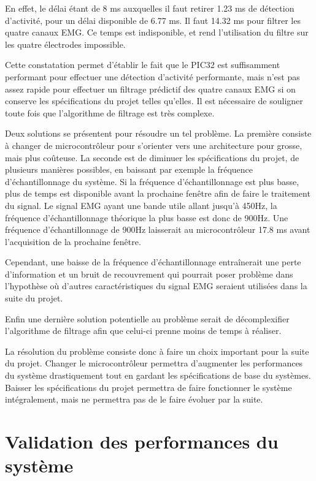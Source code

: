 \documentclass[letterpaper, twoside, 12pt, memoire, creativecommons, hyperref]{thETS}
\begin{document}
En effet, le délai étant de 8 ms auxquelles il faut retirer 1.23 ms de détection d'activité, pour un délai disponible de 6.77 ms. Il faut 14.32 ms pour filtrer les quatre canaux EMG. Ce temps est indisponible, et rend l'utilisation du filtre sur les quatre électrodes impossible.

Cette constatation permet d'établir le fait que le PIC32 est suffisamment performant pour effectuer une détection d'activité performante, mais n'est pas assez rapide pour effectuer un filtrage prédictif des quatre canaux EMG si on conserve les spécifications du projet telles qu'elles. Il est nécessaire de souligner toute fois que l'algorithme de filtrage est très complexe. 

Deux solutions se présentent pour résoudre un tel problème. La première consiste à changer de microcontrôleur pour s'orienter vers une architecture pour grosse, mais plus coûteuse. La seconde est de diminuer les spécifications du projet, de plusieurs manières possibles, en baissant par exemple la fréquence d'échantillonnage du système. Si la fréquence d'échantillonnage est plus basse, plus de temps est disponible avant la prochaine fenêtre afin de faire le traitement du signal. Le signal EMG ayant une bande utile allant jusqu'à 450Hz, la fréquence d'échantillonnage théorique la plus basse est donc de 900Hz. Une fréquence d'échantillonnage de 900Hz laisserait au microcontrôleur 17.8 ms avant l'acquisition de la prochaine fenêtre.

Cependant, une baisse de la fréquence d'échantillonnage entraînerait une perte d'information et un bruit de recouvrement qui pourrait poser problème dans l'hypothèse où d'autres caractéristiques du signal EMG seraient utilisées dans la suite du projet. 

Enfin une dernière solution potentielle au problème serait de décomplexifier l'algorithme de filtrage afin que celui-ci prenne moins de temps à réaliser.

La résolution du problème consiste donc à faire un choix important pour la suite du projet. Changer le microcontrôleur permettra d'augmenter les performances du système drastiquement tout en gardant les spécifications de base du systèmes. Baisser les spécifications du projet permettra de faire fonctionner le système intégralement, mais ne permettra pas de le faire évoluer par la suite. 

\section{Validation des performances du système}
\end{document}
